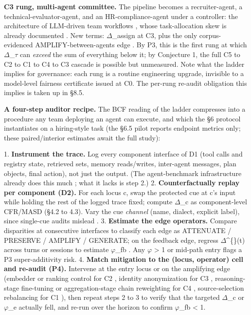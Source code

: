 \documentclass[10pt]{article}
\begin{document}
\textbf{C3 rung, multi-agent committee.} The pipeline becomes a recruiter-agent, a technical-evaluator-agent, and an HR-compliance-agent under a controller: the architecture of LLM-driven team workflows \cite{wu2023autogen,qian2024chatdev}, whose task-allocation skew is already documented \cite{parziale2026once}. New terms: $\Delta$\_assign at C3, plus the only corpus-evidenced AMPLIFY-between-agents edge \cite{nguyen2025social,madigan2025emergent}. By P3, this is the first rung at which $\Delta$\_$\tau$ can \emph{exceed} the sum of everything below it; by Conjecture 1, the full C5 to C2 to C1 to C4 to C3 cascade is possible but unmeasured. Note what the ladder implies for governance: each rung is a routine engineering upgrade, invisible to a model-level fairness certificate issued at C0. The per-rung re-audit obligation this implies is taken up in \S{}8.5.

\textbf{A four-step auditor recipe.} The BCF reading of the ladder compresses into a procedure any team deploying an agent can execute, and which the \S{}6 protocol instantiates on a hiring-style task (the \S{}6.5 pilot reports endpoint metrics only; these paired/interior estimates await the full study):

1. \textbf{Instrument the trace.} Log every component interface of D1 (tool calls and registry state, retrieved sets, memory reads/writes, inter-agent messages, plan objects, final action), not just the output. (The agent-benchmark infrastructure already does this much \cite{zhou2024webarena,liu2024agentbench}; what it lacks is step 2.)
2. \textbf{Counterfactually replay per component (D2).} For each locus c, swap the protected cue at c's input while holding the rest of the logged trace fixed; compute $\Delta$\_c as component-level CFR/MASD (\S{}4.2 to 4.3). Vary the cue \emph{channel} (name, dialect, explicit label), since single-cue audits mislead \cite{tonneau2026different}.
3. \textbf{Estimate the edge operators.} Compare disparities at consecutive interfaces to classify each edge as ATTENUATE / PRESERVE / AMPLIFY / GENERATE; on the feedback edge, regress $\Delta$\textasciicircum\{\}(t) across turns or sessions to estimate $\varphi$\_fb \cite{fan2024fairmt,she2025fairsense}. Any $\varphi$ > 1 or mid-path entry flags a P3 super-additivity risk.
4. \textbf{Match mitigation to the (locus, operator) cell and re-audit (P4).} Intervene at the entry locus or on the amplifying edge (embedder or ranking control for C2 \cite{kim2025mitigating,kim2024fair}, identity anonymization for C3 \cite{choi2025identity}, reasoning-stage fine-tuning or aggregation-stage chain reweighting for C4 \cite{kabra2025reasoning,hall2025guiding}, source-selection rebalancing for C1 \cite{singh2025biasb}), then repeat steps 2 to 3 to verify that the targeted $\Delta$\_c or $\varphi$\_e actually fell, and re-run over the horizon to confirm $\varphi$\_fb < 1.
\end{document}
